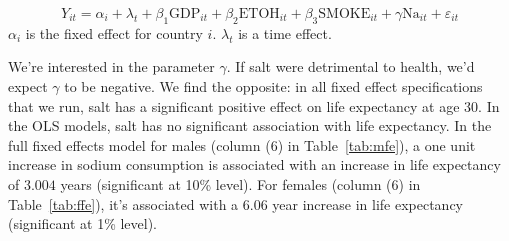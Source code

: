 \documentclass[11pt]{article}\usepackage[]{graphicx}\usepackage[]{color}
\newcommand{\eps}{\varepsilon}
\begin{document}
$$Y_{it} = \alpha_i + \lambda_t + \beta_1\text{GDP}_{it} +  \beta_2\text{ETOH}_{it} +  \beta_3\text{SMOKE}_{it} + \gamma\text{Na}_{it} + \eps_{it}$$
$\alpha_i$ is the fixed effect for country $i$.
$\lambda_t$ is a time effect.

We're interested in the parameter $\gamma$.
If salt were detrimental to health, we'd expect $\gamma$ to be negative.
We find the opposite: in all fixed effect specifications that we run, salt has a significant positive effect on life expectancy at age 30.
In the OLS models, salt has no significant association with life expectancy.
In the full fixed effects model for males (column (6) in Table~\ref{tab:mfe}), a one unit increase in sodium consumption is associated with an increase in life expectancy of $3.004$ years (significant at 10\% level).
For females (column (6) in Table~\ref{tab:ffe}), it's associated with a $6.06$ year increase in life expectancy (significant at 1\% level).
\end{document}
